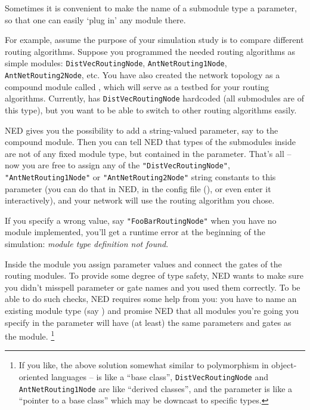 Sometimes it is convenient to make the name of a submodule type a parameter,
so that one can easily `plug in' any module there.

For example, assume the purpose of your simulation study is
to compare different routing algorithms. Suppose you programmed
the needed routing algorithms as simple modules: \texttt{DistVecRoutingNode},
\texttt{AntNetRouting1Node}, \texttt{AntNetRouting2Node}, etc.
You have also created the network topology as a compound module
called , which will serve as a testbed for your routing
algorithms. Currently,  has \texttt{DistVecRoutingNode}
hardcoded (all submodules are of this type), but you want
to be able to switch to other routing algorithms easily.

NED gives you the possibility to add a string-valued parameter,
say  to the  compound module.
Then you can tell NED that types of the submodules inside 
are not of any fixed module type, but contained in the 
parameter. That's all -- now you are free to assign any of
the \texttt{"DistVecRoutingNode"}, \texttt{"AntNetRouting1Node"} or
\texttt{"AntNetRouting2Node"} string constants to this parameter
(you can do that in NED, in the config file (),
or even enter it interactively),
and your network will use the routing algorithm you chose.

If you specify a wrong value, say \texttt{"FooBarRoutingNode"}
when you have no  module implemented,
you'll get a runtime error at the beginning of the simulation:
\textit{module type definition not found}.

Inside the  module you assign parameter values
and connect the gates of the routing modules. To provide some degree
of type safety, NED wants to make sure you didn't misspell
parameter or gate names and you used them correctly.
To be able to do such checks, NED requires some help from you:
you have to name an existing module type (say )
and promise NED that all modules you're going you specify
in the  parameter will have (at least) the same
parameters and gates as the  module.
  \footnote{If you like, the above solution somewhat similar to polymorphism
  in object-oriented languages --  is like a
  ``base class'', \texttt{DistVecRoutingNode} and \texttt{AntNetRouting1Node}
  are like ``derived classes'', and the  parameter
  is like a ``pointer to a base class'' which may be downcast to specific
  types.}

